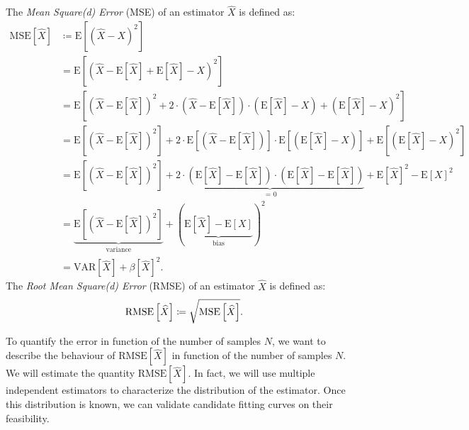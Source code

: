 \documentclass[10pt,a4paper]{article}
\numberwithin{equation}{section}
\begin{document}
The \textit{Mean Square(d) Error} (MSE) of an estimator $\widehat{X}$ is defined as:
\begin{align}
\mathrm{MSE}\left[\widehat{X}\right] &\coloneqq \mathrm{E}\left[{\left(\widehat{X} - X\right)}^{2}\right] \\
&= \mathrm{E}\left[{\left(\widehat{X} - \mathrm{E}\left[\widehat{X}\right] + \mathrm{E}\left[\widehat{X}\right] - X\right)}^{2}\right] \nonumber \\
&= \mathrm{E}\left[{\left(\widehat{X} - \mathrm{E}\left[\widehat{X}\right]\right)}^{2} + 2 \cdot \left(\widehat{X} - \mathrm{E}\left[\widehat{X}\right]\right) \cdot \left(\mathrm{E}\left[\widehat{X}\right] - X\right) + {\left(\mathrm{E}\left[\widehat{X}\right] - X\right)}^{2}\right] \nonumber \\
&= \mathrm{E}\left[{\left(\widehat{X} - \mathrm{E}\left[\widehat{X}\right]\right)}^{2}\right] + 2 \cdot \mathrm{E}\left[\left(\widehat{X} - \mathrm{E}\left[\widehat{X}\right]\right)\right] \cdot \mathrm{E}\left[\left(\mathrm{E}\left[\widehat{X}\right] - X\right)\right] + \mathrm{E}\left[{\left(\mathrm{E}\left[\widehat{X}\right] - X\right)}^{2}\right] \nonumber \\
&= \mathrm{E}\left[{\left(\widehat{X} - \mathrm{E}\left[\widehat{X}\right]\right)}^{2}\right] + \underbrace{2 \cdot \left(\mathrm{E}\left[\widehat{X}\right] - \mathrm{E}\left[\widehat{X}\right]\right) \cdot \left(\mathrm{E}\left[\widehat{X}\right] - \mathrm{E}\left[\widehat{X}\right]\right)}_{\text{ = 0}} + {\mathrm{E}\left[\widehat{X}\right]}^{2} - {\mathrm{E}\left[X\right]}^{2} \nonumber \\
&= \underbrace{\mathrm{E}\left[{\left(\widehat{X} - \mathrm{E}\left[\widehat{X}\right]\right)}^{2}\right]}_{\text{variance}} + {\left(\underbrace{\mathrm{E}\left[\widehat{X}\right] - \mathrm{E}\left[X\right]}_{\text{bias}}\right)}^{2} \nonumber \\
&= \mathrm{VAR}\left[\widehat{X}\right] + {\beta\left[\widehat{X}\right]}^{2}.
\end{align}
The \textit{Root Mean Square(d) Error} (RMSE) of an estimator $\widehat{X}$ is defined as:
\begin{equation}
\mathrm{RMSE}\left[\widehat{X}\right] \coloneqq \sqrt{\mathrm{MSE}\left[\widehat{X}\right]}. \\
\end{equation}

To quantify the error in function of the number of samples $N$, we want to describe the behaviour of $\mathrm{RMSE}\left[\widehat{X}\right]$ in function of the number of samples $N$. We will estimate the quantity $\mathrm{RMSE}\left[\widehat{X}\right]$. In fact, we will use multiple independent estimators to characterize the distribution of the estimator. Once this distribution is known, we can validate candidate fitting curves on their feasibility.
\end{document}
